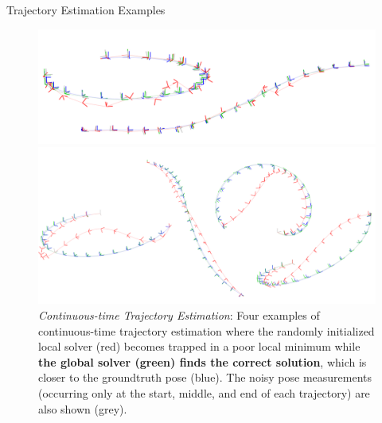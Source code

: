 \documentclass[8pt]{beamer}
\begin{document}
\begin{frame}{Trajectory Estimation Examples}
\begin{figure}
    \begin{minipage}{0.48\textwidth}
        \includegraphics[width=\linewidth]{figures/Discrete-time_Trajectory_Estimation.png}
        \caption{\textit{Discrete-time Trajectory Estimation:} Two examples of discrete-time trajectory estimation where the randomly initialized local solver (red) becomes trapped in a poor local minimum while \textbf{the global solver (green) finds the correct solution}, which is closer to the groundtruth pose (blue).}
    \end{minipage}\hfill
    \begin{minipage}{0.48\textwidth}
        \includegraphics[width=\linewidth]{figures/Continuous-time_Trajectory_Estimation.png}
        \caption{\textit{Continuous-time Trajectory Estimation}: Four examples of continuous-time trajectory estimation where the randomly initialized local solver (red) becomes trapped in a poor local minimum while \textbf{the global solver (green) finds the correct solution}, which is closer to the groundtruth pose (blue). The noisy pose measurements (occurring only at the start, middle, and end of each trajectory) are also shown (grey).}
    \end{minipage}
\end{figure}
\end{frame}
\end{document}
